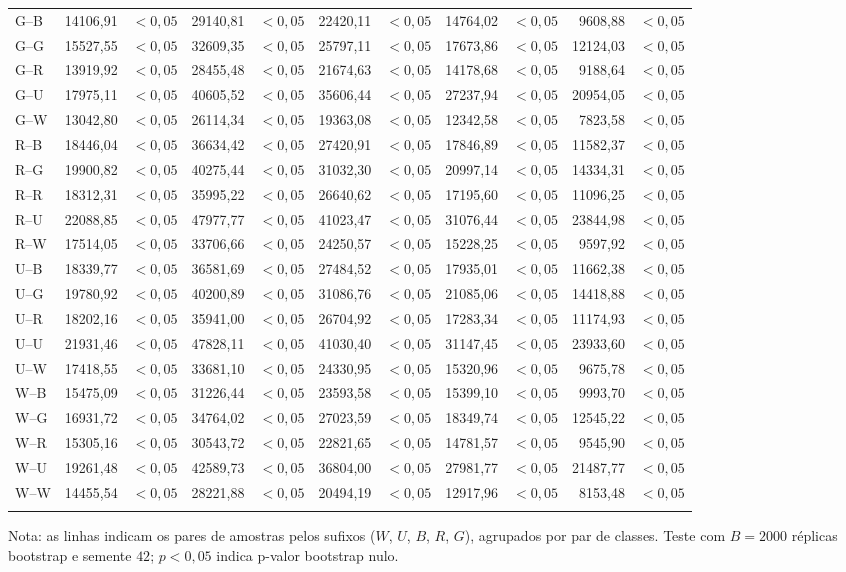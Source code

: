 {\begin{longtable}{@{}lrrrrrrrrrr@{}}
G--B & 14106,91 & $<0{,}05$ & 29140,81 & $<0{,}05$ & 22420,11 & $<0{,}05$ & 14764,02 & $<0{,}05$ & 9608,88 & $<0{,}05$ \\
G--G & 15527,55 & $<0{,}05$ & 32609,35 & $<0{,}05$ & 25797,11 & $<0{,}05$ & 17673,86 & $<0{,}05$ & 12124,03 & $<0{,}05$ \\
G--R & 13919,92 & $<0{,}05$ & 28455,48 & $<0{,}05$ & 21674,63 & $<0{,}05$ & 14178,68 & $<0{,}05$ & 9188,64 & $<0{,}05$ \\
G--U & 17975,11 & $<0{,}05$ & 40605,52 & $<0{,}05$ & 35606,44 & $<0{,}05$ & 27237,94 & $<0{,}05$ & 20954,05 & $<0{,}05$ \\
G--W & 13042,80 & $<0{,}05$ & 26114,34 & $<0{,}05$ & 19363,08 & $<0{,}05$ & 12342,58 & $<0{,}05$ & 7823,58 & $<0{,}05$ \\
R--B & 18446,04 & $<0{,}05$ & 36634,42 & $<0{,}05$ & 27420,91 & $<0{,}05$ & 17846,89 & $<0{,}05$ & 11582,37 & $<0{,}05$ \\
R--G & 19900,82 & $<0{,}05$ & 40275,44 & $<0{,}05$ & 31032,30 & $<0{,}05$ & 20997,14 & $<0{,}05$ & 14334,31 & $<0{,}05$ \\
R--R & 18312,31 & $<0{,}05$ & 35995,22 & $<0{,}05$ & 26640,62 & $<0{,}05$ & 17195,60 & $<0{,}05$ & 11096,25 & $<0{,}05$ \\
R--U & 22088,85 & $<0{,}05$ & 47977,77 & $<0{,}05$ & 41023,47 & $<0{,}05$ & 31076,44 & $<0{,}05$ & 23844,98 & $<0{,}05$ \\
R--W & 17514,05 & $<0{,}05$ & 33706,66 & $<0{,}05$ & 24250,57 & $<0{,}05$ & 15228,25 & $<0{,}05$ & 9597,92 & $<0{,}05$ \\
U--B & 18339,77 & $<0{,}05$ & 36581,69 & $<0{,}05$ & 27484,52 & $<0{,}05$ & 17935,01 & $<0{,}05$ & 11662,38 & $<0{,}05$ \\
U--G & 19780,92 & $<0{,}05$ & 40200,89 & $<0{,}05$ & 31086,76 & $<0{,}05$ & 21085,06 & $<0{,}05$ & 14418,88 & $<0{,}05$ \\
U--R & 18202,16 & $<0{,}05$ & 35941,00 & $<0{,}05$ & 26704,92 & $<0{,}05$ & 17283,34 & $<0{,}05$ & 11174,93 & $<0{,}05$ \\
U--U & 21931,46 & $<0{,}05$ & 47828,11 & $<0{,}05$ & 41030,40 & $<0{,}05$ & 31147,45 & $<0{,}05$ & 23933,60 & $<0{,}05$ \\
U--W & 17418,55 & $<0{,}05$ & 33681,10 & $<0{,}05$ & 24330,95 & $<0{,}05$ & 15320,96 & $<0{,}05$ & 9675,78 & $<0{,}05$ \\
W--B & 15475,09 & $<0{,}05$ & 31226,44 & $<0{,}05$ & 23593,58 & $<0{,}05$ & 15399,10 & $<0{,}05$ & 9993,70 & $<0{,}05$ \\
W--G & 16931,72 & $<0{,}05$ & 34764,02 & $<0{,}05$ & 27023,59 & $<0{,}05$ & 18349,74 & $<0{,}05$ & 12545,22 & $<0{,}05$ \\
W--R & 15305,16 & $<0{,}05$ & 30543,72 & $<0{,}05$ & 22821,65 & $<0{,}05$ & 14781,57 & $<0{,}05$ & 9545,90 & $<0{,}05$ \\
W--U & 19261,48 & $<0{,}05$ & 42589,73 & $<0{,}05$ & 36804,00 & $<0{,}05$ & 27981,77 & $<0{,}05$ & 21487,77 & $<0{,}05$ \\
W--W & 14455,54 & $<0{,}05$ & 28221,88 & $<0{,}05$ & 20494,19 & $<0{,}05$ & 12917,96 & $<0{,}05$ & 8153,48 & $<0{,}05$ \\
\addlinespace[2pt]
\end{longtable}
}
\footnotesize{Nota: as linhas indicam os pares de amostras pelos sufixos ($W$, $U$, $B$, $R$, $G$), agrupados por par de classes. Teste com $B=2000$ réplicas bootstrap e semente $42$; $p<0{,}05$ indica p-valor bootstrap nulo.}
